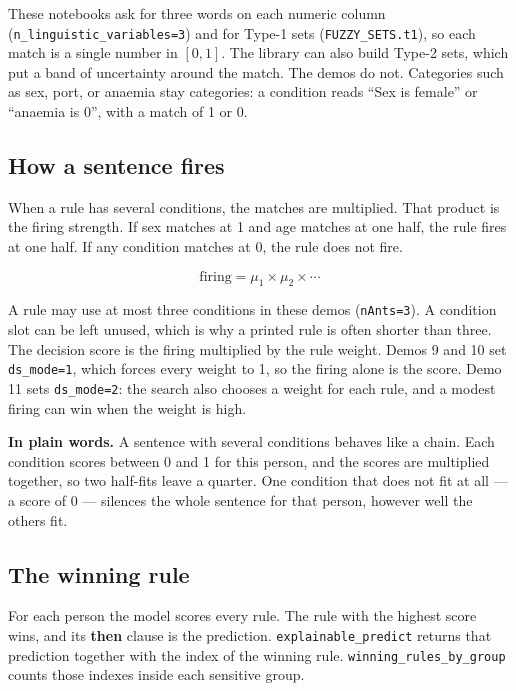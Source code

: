 \documentclass[11pt]{article}
\newcommand{\fn}[1]{\texttt{\small #1}}
\begin{document}
\noindent
These notebooks ask for three words on each numeric column (\fn{n\_linguistic\_variables=3}) and for Type-1 sets (\fn{FUZZY\_SETS.t1}), so each match is a single number in \([0,1]\). The library can also build Type-2 sets, which put a band of uncertainty around the match. The demos do not. Categories such as sex, port, or anaemia stay categories: a condition reads ``Sex is female'' or ``anaemia is 0'', with a match of 1 or 0.

\subsection{How a sentence fires}

When a rule has several conditions, the matches are multiplied. That product is the firing strength. If sex matches at 1 and age matches at one half, the rule fires at one half. If any condition matches at 0, the rule does not fire.

\[
\text{firing} = \mu_1 \times \mu_2 \times \cdots
\]

A rule may use at most three conditions in these demos (\fn{nAnts=3}). A condition slot can be left unused, which is why a printed rule is often shorter than three. The decision score is the firing multiplied by the rule weight. Demos 9 and 10 set \fn{ds\_mode=1}, which forces every weight to 1, so the firing alone is the score. Demo 11 sets \fn{ds\_mode=2}: the search also chooses a weight for each rule, and a modest firing can win when the weight is high.

\begin{plainwords}
\textbf{In plain words.} A sentence with several conditions behaves like a chain. Each condition scores between 0 and 1 for this person, and the scores are multiplied together, so two half-fits leave a quarter. One condition that does not fit at all --- a score of 0 --- silences the whole sentence for that person, however well the others fit.
\end{plainwords}

\subsection{The winning rule}

For each person the model scores every rule. The rule with the highest score wins, and its \textbf{then} clause is the prediction. \fn{explainable\_predict} returns that prediction together with the index of the winning rule. \fn{winning\_rules\_by\_group} counts those indexes inside each sensitive group.
\end{document}
